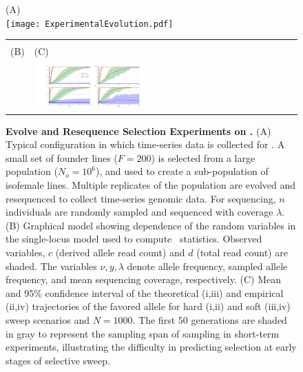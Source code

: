 \begin{figure}[H]
		\centering
(A)\\
	\texttt{[image: ExperimentalEvolution.pdf]}\\

\begin{tabular}{l|l}
		\hline\\
		(B) &(C)\\
		\raisebox{0.1in}{
\texttt{[image: HMMGM.pdf]}}
& 	\includegraphics[trim=0in 0.in 0in 
0.0in,clip,width=0.45\textwidth]{AF.pdf}	

\end{tabular}
\hspace{-1in}
\caption{{\bf Evolve and Resequence Selection Experiments on \dmel.}
  (A) Typical configuration in which time-series data is collected for
  \dmel. A small set of founder lines ($F=200$) is selected from a
  large population ($N_o=10^{6}$), and used to create a sub-population
  of isofemale lines. Multiple replicates of the population are
  evolved and resequenced to collect time-series genomic data. For
  sequencing, $n$ individuals are randomly sampled and sequenced with
  coverage $\lambda$.  (B) Graphical model showing dependence of the
  random variables in the single-locus model used to compute \comale\
  statistics. Observed variables, $c$ (derived allele read count) and
  $d$ (total read count) are shaded. The variables $\nu,y,\lambda$
  denote allele frequency, sampled allele frequency, and mean
  sequencing coverage, respectively. (C) Mean and 95\% confidence
  interval of the theoretical (i,iii) and empirical (ii,iv)
  trajectories of the favored allele for hard (i,ii) and soft (iii,iv)
  sweep scenarios and $N=1000$.  The first $50$ generations are shaded
  in gray to represent the sampling span of sampling in short-term
  experiments, illustrating the difficulty in predicting selection at
  early stages of selective sweep.  }
\label{fig:1}
\end{figure}




